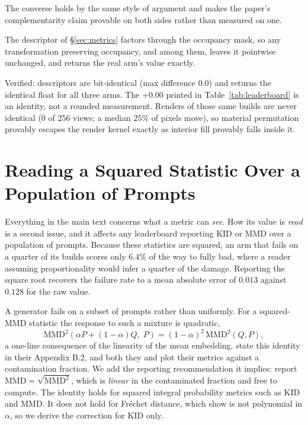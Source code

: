 The converse holds by the same style of argument and makes the paper's
complementarity claim provable on both sides rather than measured on one.

\begin{lemma}\label{lem:matblind}
The descriptor of \S\ref{sec:metrics} factors through the occupancy mask, so any
transformation preserving occupancy, \matshuffle{} and \monochrome{} among them,
leaves
it pointwise unchanged, and \vkid{} returns the real arm's value exactly.
\end{lemma}

Verified: descriptors are bit-identical (max difference $0.0$) and \vkid{}
returns the identical float for all three arms. The $+0.00$ printed in
Table~\ref{tab:leaderboard} is an identity, not a rounded measurement. Renders
of those same builds are never identical ($0$ of $256$ views; a median $25\%$ of
pixels move), so material permutation provably escapes the render kernel exactly
as interior fill provably falls inside it.

\section{Reading a Squared Statistic Over a Population of Prompts}
\label{app:failrate}

Everything in the main text concerns what a metric can \emph{see}. How its value is
\emph{read} is a second issue, and it affects any leaderboard reporting KID or MMD over a
population of prompts. Because these statistics are squared, an arm that fails on a quarter
of its builds scores only $6.4\%$ of the way to fully bad, where a reader assuming
proportionality would infer a quarter of the damage. Reporting the square root recovers the failure rate to a mean absolute error of $0.013$
against $0.128$ for the raw value.


A generator fails on a subset of prompts rather than uniformly. For a squared-MMD
statistic the response to such a mixture is quadratic,
\begin{equation}
\mathrm{MMD}^2\!\left(\alpha P + (1-\alpha)Q,\; P\right)
  = (1-\alpha)^2\,\mathrm{MMD}^2(Q, P),
\label{eq:mixture}
\end{equation}
a one-line consequence of the linearity of the mean embedding.
\citet{binkowski2018kid} state this identity in their Appendix B.2, and both they and
\citet{heusel2017fid} plot their metrics against a contamination fraction. We add the
reporting recommendation it implies: report $\mathrm{MMD} = \sqrt{\mathrm{MMD}^2}$, which
is \emph{linear} in the contaminated fraction and free to compute. The identity holds for
squared integral probability metrics such as KID and MMD. It does not hold for
Fr\'echet distance, which \citet{binkowski2018kid} show is not polynomial in $\alpha$,
so we derive the correction for KID only.


